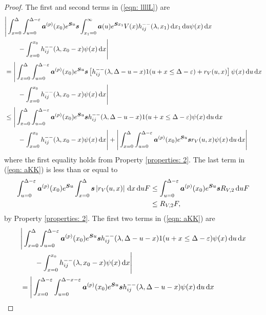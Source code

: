 \begin{proof}
	The first and second terms in (\ref{eqn: llllL}) are
	\begin{align}
		&\Bigg|\int_{x=0}^{\Delta}\int_{u=0}^{\Delta-\varepsilon} \boldsymbol a^{(p)}(x_0)e^{\boldsymbol Su}\boldsymbol s \int_{x_1=0}^\infty \boldsymbol a(u)  e^{\boldsymbol S x_1} V(x) h_{ij}^{--}(\lambda, x_1) \, \mathrm{d} x_1 \, \mathrm{d} u \psi(x) \, \mathrm{d} x \nonumber
		\\&{}\qquad {} - \int_{x=0}^{x_0} h_{ij}^{--}(\lambda, x_0 - x)\psi(x)\, \mathrm{d} x\Bigg| \nonumber
		\\&=\Bigg|\int_{x=0}^{\Delta}\int_{u=0}^{\Delta-\varepsilon} \boldsymbol a^{(p)}(x_0)e^{\boldsymbol Su}\boldsymbol s \left[ h_{ij}^{--}(\lambda, \Delta - u - x)1(u+x\leq \Delta-\varepsilon) + r_V(u,x) \right] \psi(x) \, \mathrm{d} u \, \mathrm{d} x \nonumber
		\\&{}\qquad {} - \int_{x=0}^{x_0} h_{ij}^{--}(\lambda, x_0 - x)\psi(x)\, \mathrm{d} x \Bigg|\nonumber
		\\&\leq \Bigg|\int_{x=0}^{\Delta}\int_{u=0}^{\Delta-\varepsilon} \boldsymbol a^{(p)}(x_0)e^{\boldsymbol Su}\boldsymbol s h_{ij}^{--}(\lambda, \Delta - u - x)1(u+x\leq \Delta-\varepsilon) \psi(x) \, \mathrm{d} u \, \mathrm{d} x \nonumber 
		\\&\qquad{} - \int_{x=0}^{x_0} h_{ij}^{--}(\lambda, x_0 - x)\psi(x)\, \mathrm{d} x \Bigg| + \Bigg| \int_{x=0}^{\Delta}\int_{u=0}^{\Delta-\varepsilon} \boldsymbol a^{(p)}(x_0)e^{\boldsymbol Su}\boldsymbol s r_V(u,x) \psi(x) \, \mathrm{d} u \, \mathrm{d} x \Bigg|
		\label{eqn: aKK}
	\end{align}
	where the first equality holds from Property \ref{properties: 2}. The last term in (\ref{eqn: aKK}) is less than or equal to 
	\begin{align}
		\int_{u=0}^{\Delta-\varepsilon} \boldsymbol a^{(p)}(x_0)e^{\boldsymbol Su} \int_{x=0}^{\Delta} \boldsymbol s \left|r_V(u,x)\right|\, \mathrm{d} x \, \mathrm{d} u F 
		&\leq \int_{u=0}^{\Delta-\varepsilon} \boldsymbol a^{(p)}(x_0)e^{\boldsymbol Su} \boldsymbol sR_{V,2} \, \mathrm{d} u F \nonumber 
		\\&\leq R_{V,2} F, \label{eqn: HhHj}
	\end{align}
	by Property \ref{properties: 2}. The first two terms in (\ref{eqn: aKK}) are 
	\begin{align}
		& \Bigg|\int_{x=0}^{\Delta}\int_{u=0}^{\Delta-\varepsilon} \bs a^{(p)}(x_0)e^{\bs Su}\bs s h_{ij}^{--}(\lambda, \Delta - u - x)1(u+x\leq \Delta-\varepsilon) \psi(x) \wrt u \wrt x \nonumber
		\\&\qquad{} - \int_{x=0}^{x_0} h_{ij}^{--}(\lambda, x_0 - x)\psi(x)\wrt x \Bigg| \nonumber 
		\\&= \Bigg|\int_{x=0}^{\Delta-\varepsilon}\int_{u=0}^{\Delta-x-\varepsilon} \bs a^{(p)}(x_0)e^{\bs Su}\bs s h_{ij}^{--}(\lambda, \Delta - u - x) \psi(x) \wrt u \wrt x \nonumber

\end{align}
\end{proof}
